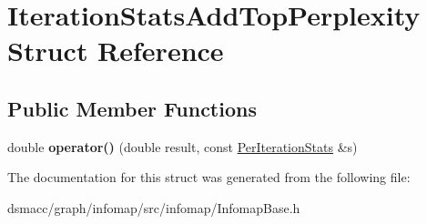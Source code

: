 \hypertarget{structIterationStatsAddTopPerplexity}{}\section{Iteration\+Stats\+Add\+Top\+Perplexity Struct Reference}
\label{structIterationStatsAddTopPerplexity}
\subsection*{Public Member Functions}
\begin{DoxyCompactItemize}
\item 
\mbox{\label{structIterationStatsAddTopPerplexity_ace2f73f3bcc57ac918ce0553634b8a45}} 
double {\bfseries operator()} (double result, const \mbox{\hyperlink{structPerIterationStats}{Per\+Iteration\+Stats}} \&s)
\end{DoxyCompactItemize}


The documentation for this struct was generated from the following file\+:\begin{DoxyCompactItemize}
\item 
dsmacc/graph/infomap/src/infomap/Infomap\+Base.\+h\end{DoxyCompactItemize}
